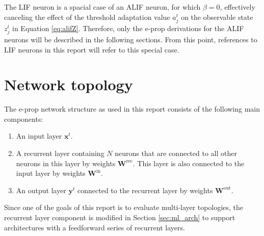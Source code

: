             The LIF neuron is a spacial case of an ALIF neuron, for which $\beta=0$, effectively canceling the effect of the threshold adaptation value $a^t_j$ on the observable state $z^t_j$ in Equation \ref{eq:alifZ}.
            Therefore, only the e-prop derivations for the ALIF neurons will be described in the following sections.
            From this point, references to LIF neurons in this report will refer to this special case.

    \section{Network topology}
        The e-prop network structure as used in this report consists of the following main components:
        \begin{enumerate}
            \item An input layer $\mathbf{x}^t$.
            \item A recurrent layer containing $N$ neurons that are connected to all other neurons in this layer by weights $\mathbf{W}^\text{rec}$. This layer is also connected to the input layer by weights $\mathbf{W}^\text{in}$.
            \item An output layer $\mathbf{y}^t$ connected to the recurrent layer by weights $\mathbf{W}^\text{out}$.
        \end{enumerate}

        Since one of the goals of this report is to evaluate multi-layer topologies, the recurrent layer component is modified in Section \ref{sec:ml_arch} to support architectures with a feedforward series of recurrent layers.

